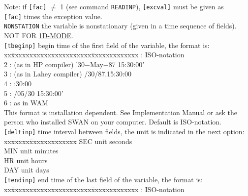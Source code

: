 \documentclass[12pt]{book}
\begin{document}
\begin{tabbing}
                       Note: if {\tt [fac]} $\neq$ 1 (see command {\tt READINP}), {\tt [excval]} must be given as\\
                       {\tt [fac]} times the exception value.\-\\
{\tt NONSTATION}    \> the variable is nonstationary (given in a time sequence of fields).\+\\
                       NOT FOR \underline{1D-MODE}.\-\\
{\tt [tbeginp]}     \> begin time of the first field of the variable, the format is:\+\\
                       \pushtabs
                       xx\=xxxxxxxxxxxxxxxxxxxxxx\=xxxxxxxxxxxxx  \>: ISO-notation                     \\
                       2 \>: (as in HP compiler)    \> '30$-$May$-$87 15:30:00' \\
                       3 \>: (as in Lahey compiler) /30/87.15:30:00        \\
                       4 \>:                        :30:00                 \\
                       5 \>:                        /05/30 15:30:00'       \\
                       6 \>: as in WAM                             \\
                       \poptabs
                       This format is installation dependent. See Implementation Manual or ask the\\
                       person who installed SWAN on your computer. Default is ISO-notation.\-\\
{\tt [deltinp]}     \> time interval between fields, the unit is indicated in the next option:\+\\
                       \pushtabs
                       xxxxxxx\=xxxxxxxxxxxxx \kill
                       SEC \> unit seconds\\
                       MIN \> unit minutes\\
                       HR  \> unit hours\\
                       DAY \> unit days\-\\
                       \poptabs
{\tt [tendinp]}     \> end time of the last field of the variable, the format is:\+\\
                       \pushtabs
                       xx\=xxxxxxxxxxxxxxxxxxxxxx\=xxxxxxxxxxxxx  \>: ISO-notation                     \\

\end{tabbing}
\end{document}
